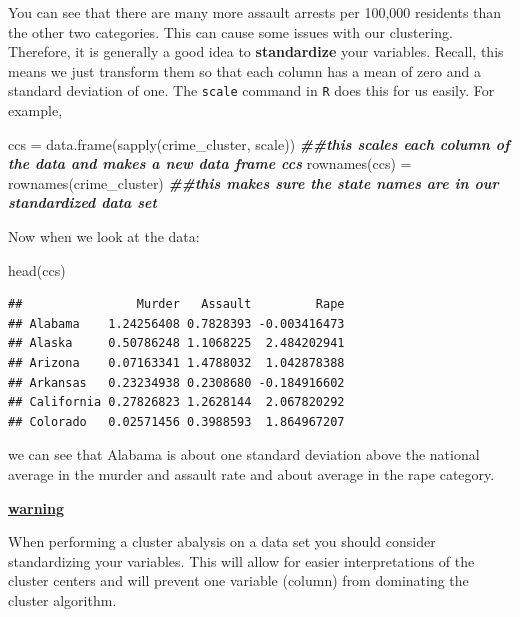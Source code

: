 \documentclass[
]{book}
\newenvironment{Shaded}{\begin{snugshade}}{\end{snugshade}}
\newcommand{\DocumentationTok}[1]{\textcolor[rgb]{0.56,0.35,0.01}{\textbf{\textit{#1}}}}
\newcommand{\FunctionTok}[1]{\textcolor[rgb]{0.00,0.00,0.00}{#1}}
\newcommand{\NormalTok}[1]{#1}
\newcommand{\OtherTok}[1]{\textcolor[rgb]{0.56,0.35,0.01}{#1}}
\newenvironment{rmdblock}[1]
  {\begin{shaded*}
  \centerline{\underline{\textbf{#1}}}

  }
  {
  \end{shaded*}
  }
\newenvironment{warning}
  {\begin{rmdblock}{warning}}
  {\end{rmdblock}}
\theoremstyle{definition}
\theoremstyle{definition}
\theoremstyle{definition}
\theoremstyle{definition}
\theoremstyle{remark}
\begin{document}
You can see that there are many more assault arrests per 100,000 residents than the other two categories. This can cause some issues with our clustering. Therefore, it is generally a good idea to \textbf{standardize} your variables. Recall, this means we just transform them so that each column has a mean of zero and a standard deviation of one. The \texttt{scale} command in \texttt{R} does this for us easily. For example,

\begin{Shaded}
\begin{Highlighting}[]
\NormalTok{ccs }\OtherTok{=} \FunctionTok{data.frame}\NormalTok{(}\FunctionTok{sapply}\NormalTok{(crime\_cluster, scale))  }\DocumentationTok{\#\#this scales each column of the data and makes a new data frame ccs}
\FunctionTok{rownames}\NormalTok{(ccs) }\OtherTok{=} \FunctionTok{rownames}\NormalTok{(crime\_cluster)  }\DocumentationTok{\#\#this makes sure the state names are in our standardized data set}
\end{Highlighting}
\end{Shaded}

Now when we look at the data:

\begin{Shaded}
\begin{Highlighting}[]
\FunctionTok{head}\NormalTok{(ccs)}
\end{Highlighting}
\end{Shaded}

\begin{verbatim}
##                Murder   Assault         Rape
## Alabama    1.24256408 0.7828393 -0.003416473
## Alaska     0.50786248 1.1068225  2.484202941
## Arizona    0.07163341 1.4788032  1.042878388
## Arkansas   0.23234938 0.2308680 -0.184916602
## California 0.27826823 1.2628144  2.067820292
## Colorado   0.02571456 0.3988593  1.864967207
\end{verbatim}

we can see that Alabama is about one standard deviation above the national average in the murder and assault rate and about average in the rape category.

\begin{warning}
When performing a cluster abalysis on a data set you should consider standardizing your variables. This will allow for easier interpretations of the cluster centers and will prevent one variable (column) from dominating the cluster algorithm.
\end{warning}
\end{document}
